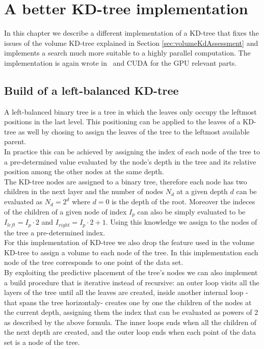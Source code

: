 \chapter{A better KD-tree implementation}\label{ch:fkdtree}
In this chapter we describe a different implementation of a KD-tree that fixes the issues of the volume KD-tree explained in Section \ref{sec:volumeKdAssessment} and implements a search much more suitable to a highly parallel computation. The implementation is again wrote in \CC\ and CUDA for the GPU relevant parts.

\section{Build of a left-balanced KD-tree}
A left-balanced binary tree is a tree in which the leaves only occupy the leftmost positions in the last level. This positioning can be applied to the leaves of a KD-tree as well by chosing to assign the leaves of the tree to the leftmost available parent.\\
In practice this can be achieved by assigning the index of each node of the tree to a pre-determined value evaluated by the node's depth in the tree and its relative position among the other nodes at the same depth.\\
The KD-tree nodes are assigned to a binary tree, therefore each node has two children in the next layer and the number of nodes $N_d$ at a given depth $d$ can be evaluated as $N_d = 2^d$ where $d = 0$ is the depth of the root. Moreover the indeces of the children of a given node of index $I_p$ can also be simply evaluated to be $I_{left} = I_p \cdot 2$ and $I_{right} = I_p \cdot 2 + 1$. Using this knowledge we assign to the nodes of the tree a pre-determined index.\\
For this implementation of KD-tree we also drop the feature used in the volume KD-tree to assign a volume to each node of the tree. In this implementation each node of the tree corresponds to one point of the data set.\\
By exploiting the predictive placement of the tree's nodes we can also implement a build procedure that is iterative instead of recursive: an outer loop visits all the layers of the tree until all the leaves are created, inside another internal loop -that spans the tree horizontaly- creates one by one the children of the nodes at the current depth, assigning them the index that can be evaluated as powers of 2 as described by the above formula. The inner loops ends when all the children of the next depth are created, and the outer loop ends when each point of the data set is a node of the tree.\\
